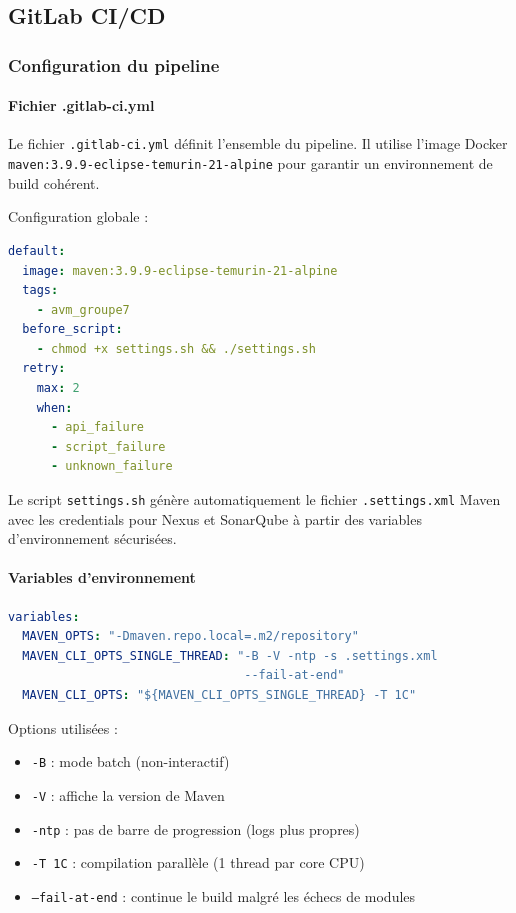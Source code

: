 \subsection{GitLab CI/CD}

\subsubsection{Configuration du pipeline}

\paragraph{Fichier .gitlab-ci.yml}

Le fichier \texttt{.gitlab-ci.yml} définit l'ensemble du pipeline. Il utilise l'image Docker \texttt{maven:3.9.9-eclipse-temurin-21-alpine} pour garantir un environnement de build cohérent.

Configuration globale :
\begin{lstlisting}[language=yaml, caption=Configuration globale GitLab CI]
default:
  image: maven:3.9.9-eclipse-temurin-21-alpine
  tags:
    - avm_groupe7
  before_script:
    - chmod +x settings.sh && ./settings.sh
  retry:
    max: 2
    when:
      - api_failure
      - script_failure
      - unknown_failure
\end{lstlisting}

Le script \texttt{settings.sh} génère automatiquement le fichier \texttt{.settings.xml} Maven avec les credentials pour Nexus et SonarQube à partir des variables d'environnement sécurisées.

\paragraph{Variables d'environnement}

\vspace{0.3cm}
\begin{lstlisting}[language=yaml, caption=Variables Maven]
variables:
  MAVEN_OPTS: "-Dmaven.repo.local=.m2/repository"
  MAVEN_CLI_OPTS_SINGLE_THREAD: "-B -V -ntp -s .settings.xml
                                 --fail-at-end"
  MAVEN_CLI_OPTS: "${MAVEN_CLI_OPTS_SINGLE_THREAD} -T 1C"
\end{lstlisting}

Options utilisées :
\begin{itemize}
    \item \texttt{-B} : mode batch (non-interactif)
    \item \texttt{-V} : affiche la version de Maven
    \item \texttt{-ntp} : pas de barre de progression (logs plus propres)
    \item \texttt{-T 1C} : compilation parallèle (1 thread par core CPU)
    \item \texttt{--fail-at-end} : continue le build malgré les échecs de modules
\end{itemize}

